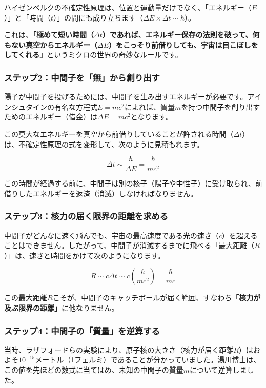 ハイゼンベルクの不確定性原理は、位置と運動量だけでなく、「エネルギー（\(E\)）」と「時間（\(t\)）」の間にも成り立ちます（\(\Delta E\times\Delta t\sim\hbar\)）。

これは、\textbf{「極めて短い時間（\(\Delta t\)）であれば、エネルギー保存の法則を破って、何もない真空からエネルギー（\(\Delta E\)）をこっそり前借りしても、宇宙は目こぼしをしてくれる」}というミクロの世界の奇妙なルールです。

\subsubsection{ステップ2：中間子を「無」から創り出す}

陽子が中間子を投げるためには、中間子を生み出すエネルギーが必要です。アインシュタインの有名な方程式\(E=mc^2\)によれば、質量\(m\)を持つ中間子を創り出すためのエネルギー（借金）は\(\Delta E=mc^2\)となります。

この莫大なエネルギーを真空から前借りしていることが許される時間（\(\Delta t\)）は、不確定性原理の式を変形して、次のように見積もれます。

\[
\Delta t \sim \frac{\hbar}{\Delta E}
= \frac{\hbar}{mc^2}
\]

この時間が経過する前に、中間子は別の核子（陽子や中性子）に受け取られ、前借りしたエネルギーを返済（消滅）しなければなりません。

\subsubsection{ステップ3：核力の届く限界の距離を求める}

中間子がどんなに速く飛んでも、宇宙の最高速度である光の速さ（\(c\)）を超えることはできません。したがって、中間子が消滅するまでに飛べる「最大距離（\(R\)）」は、速さと時間をかけて次のようになります。

\[
R \sim c\Delta t
\sim c\left(\frac{\hbar}{mc^2}\right)
= \frac{\hbar}{mc}
\]

この最大距離\(R\)こそが、中間子のキャッチボールが届く範囲、すなわち\textbf{「核力が及ぶ限界の距離」}に他なりません。

\subsubsection{ステップ4：中間子の「質量」を逆算する}

当時、ラザフォードらの実験により、原子核の大きさ（核力が届く距離\(R\)）はおよそ\(10^{-15}\)メートル（1フェルミ）であることが分かっていました。湯川博士は、この値を先ほどの数式に当てはめ、未知の中間子の質量\(m\)について逆算しました。

